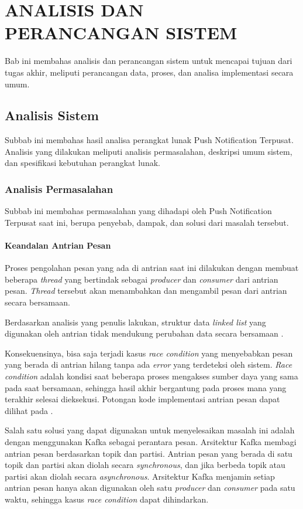 \chapter{ANALISIS DAN PERANCANGAN SISTEM}
\par Bab ini membahas analisis dan perancangan sistem untuk mencapai tujuan dari tugas akhir, meliputi perancangan data, proses, dan analisa implementasi secara umum.

\section{Analisis Sistem}
\par Subbab ini membahas hasil analisa perangkat lunak Push Notification Terpusat.
Analisis yang dilakukan meliputi analisis permasalahan, deskripsi umum sistem, dan spesifikasi kebutuhan perangkat lunak.

\subsection{Analisis Permasalahan}
\par Subbab ini membahas permasalahan yang dihadapi oleh Push Notification Terpusat saat ini, berupa penyebab, dampak, dan solusi dari masalah tersebut.

\subsubsection{Keandalan Antrian Pesan}
\par Proses pengolahan pesan yang ada di antrian saat ini dilakukan dengan membuat beberapa \textit{thread} yang bertindak sebagai \textit{producer} dan \textit{consumer} dari antrian pesan. \textit{Thread} tersebut akan menambahkan dan mengambil pesan dari antrian secara bersamaan.
\par Berdasarkan analisis yang penulis lakukan, struktur data \textit{linked list} yang digunakan oleh antrian tidak mendukung perubahan data secara bersamaan \cite{linkedlist-online}.
\par Konsekuensinya, bisa saja terjadi kasus \textit{race condition} yang menyebabkan pesan yang berada di antrian hilang tanpa ada \textit{error} yang terdeteksi oleh sistem. \textit{Race condition} adalah kondisi saat beberapa proses mengakses sumber daya yang sama pada saat bersamaan, sehingga hasil akhir bergantung pada proses mana yang terakhir selesai dieksekusi. Potongan kode implementasi antrian pesan dapat dilihat pada .
\par Salah satu solusi yang dapat digunakan untuk menyelesaikan masalah ini adalah dengan menggunakan Kafka sebagai perantara pesan. Arsitektur Kafka membagi antrian pesan berdasarkan topik dan partisi. Antrian pesan yang berada di satu topik dan partisi akan diolah secara \textit{synchronous}, dan jika berbeda topik atau partisi akan diolah secara \textit{asynchronous}. Arsitektur Kafka menjamin setiap antrian pesan hanya akan digunakan oleh satu \textit{producer} dan \textit{consumer} pada satu waktu, sehingga kasus \textit{race condition} dapat dihindarkan.

